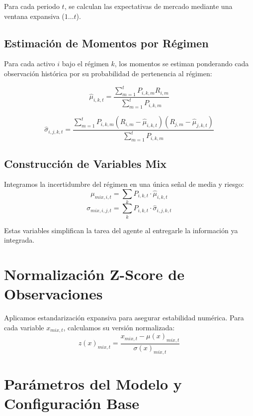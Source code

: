 \documentclass[11pt,a4paper]{article}
\begin{document}
Para cada periodo $t$, se calculan las expectativas de mercado mediante una ventana expansiva ($1 \dots t$).

\subsection{Estimación de Momentos por Régimen}
Para cada activo $i$ bajo el régimen $k$, los momentos se estiman ponderando cada observación histórica por su probabilidad de pertenencia al régimen:

\begin{equation}
    \hat{\mu}_{i,k,t} = \frac{\sum_{m=1}^t P_{i,k,m} R_{i,m}}{\sum_{m=1}^t P_{i,k,m}}
\end{equation}

\begin{equation}
    \hat{\sigma}_{i,j,k,t} = \frac{\sum_{m=1}^t P_{i,k,m} (R_{i,m} - \hat{\mu}_{i,k,t})(R_{j,m} - \hat{\mu}_{j,k,t})}{\sum_{m=1}^t P_{i,k,m}}
\end{equation}

\subsection{Construcción de Variables Mix}
Integramos la incertidumbre del régimen en una única señal de media y riesgo:
\begin{equation}
    \mu_{mix, i,t} = \sum_{k} P_{i,k,t} \cdot \hat{\mu}_{i,k,t}
\end{equation}
\begin{equation}
    \sigma_{mix, i,j,t} = \sum_{k} P_{i,k,t} \cdot \hat{\sigma}_{i,j,k,t}
\end{equation}

Estas variables simplifican la tarea del agente al entregarle la información ya integrada.

\section{Normalización Z-Score de Observaciones}

Aplicamos estandarización expansiva para asegurar estabilidad numérica. Para cada variable $x_{mix, t}$, calculamos su versión normalizada:
\begin{equation}
    z(x)_{mix, t} = \frac{x_{mix, t} - \mu(x)_{mix, t}}{\sigma(x)_{mix, t}}
\end{equation}

\section{Parámetros del Modelo y Configuración Base}
\end{document}
